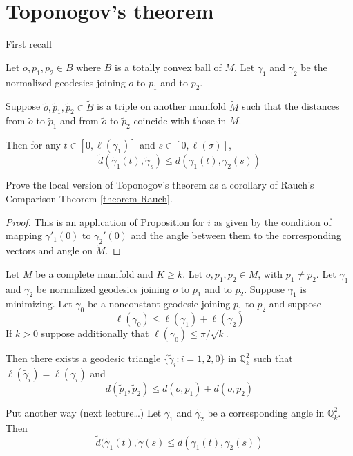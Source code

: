 \section{Toponogov's theorem}
\label{section-Toponogov}

First recall

\begin{theorem}
\label{theorem-Toponogov,local}
Let $o,p_1,p_2 \in B$ where $B$ is a totally convex ball of $M$. Let $\gamma_1$
and $\gamma_2$ be the normalized geodesics joining $o$ to $p_1$ and to $p_2$.

Suppose $\tilde{o}, \tilde{p}_1,\tilde{p}_2 \in \tilde{B}$ is a triple on 
another manifold $\tilde{M}$ such that the distances from $\tilde{o}$ to
$\tilde{p}_1$ and from $\tilde{o}$ to $\tilde{p}_2$ coincide with those in $M$.

Then for any $t \in [0,\ell(\gamma_1)]$ and $s \in [0,\ell(\sigma)]$,
$$
\tilde{d}(\tilde{\gamma}_1(t),\tilde{\gamma}_s)\leq d(\gamma_1(t),\gamma_2(s))
$$
\end{theorem}

\begin{exercise}[Lista 7]
\label{exercise-Toponogov-from-Rauch}
Prove the local version of Toponogov's theorem as a corollary of Rauch's
Comparison Theorem \ref{theorem-Rauch}.
\end{exercise}

\begin{proof}
This is an application of Proposition \label{proposition:contraction} for $i$ as
given by the condition of mapping $\gamma'_1(0)$ to $\gamma_2'(0)$ and the angle
between them to the corresponding vectors and angle on $\tilde{M}$.
\end{proof}

\begin{theorem} \label{theorem-Toponogov-hinge}
Let $M$ be a complete manifold and $K \geq k$. Let $o,p_1,p_2 \in M$, with
$p_1\neq  p_2$. Let $\gamma_1$ and $\gamma_2$ be normalized geodesics joining 
$o$ to $p_1$ and to $p_2$. Suppose $\gamma_1$ is minimizing.
Let $\gamma_0$ be a nonconstant geodesic joining $p_1$ to $p_2$ and suppose
$$
\ell(\gamma_0) \leq \ell(\gamma_1) +\ell(\gamma_2)
$$
If $k>0$ suppose additionally that $\ell(\gamma_0) \leq \pi/\sqrt{k}$.

Then there exists a geodesic triangle $\{\tilde{\gamma}_i:i=1,2,0\}$ in
$\mathbb{Q}_k^2$ such that $\ell(\tilde{\gamma}_i) = \ell(\gamma_i)$ and
$$
d(\tilde{p}_1,\tilde{p}_2) \leq  d(o,p_1)+d(o,p_2)
$$

Put another way (next lecture…) Let $\tilde{\gamma}_1$ and $\tilde{\gamma}_2$ 
be a corresponding angle in $\mathbb{Q}_k^2$. Then
$$
\tilde{d}(\tilde{\gamma}_1(t),\tilde{\gamma}(s)\leq d(\gamma_1(t),\gamma_2(s))
$$

\end{theorem}

